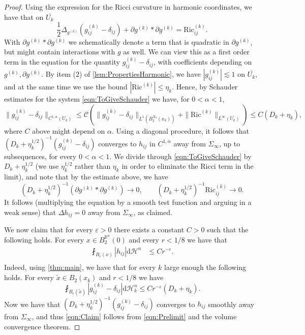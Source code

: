 \documentclass[12pt,a4paper,reqno]{amsart}
\renewcommand{\leq}{\leqslant}
\renewcommand{\d}{\ensuremath{\mathrm d}}
\renewcommand{\tilde}{\widetilde}
\begin{document}
\begin{proof}
    Using the expression for the Ricci curvature in  harmonic coordinates, we have that on $\overline{U_k}$
    \begin{equation}\label{eqn:ToGiveSchauder}
    \frac{1}{2}\Delta_{g^{(k)}} (g^{(k)}_{ij}-\delta_{ij})+\partial g^{(k)}\ast \partial g^{(k)}=\mathrm{Ric}^{(k)}_{ij}.
    \end{equation}
    With $\partial g^{(k)}\ast \partial g^{(k)}$ we schematically denote a term that is quadratic in $\partial g^{(k)}$, but might contain interactions with $g$ as well. We can view this as a first order term in the equation for the quantity $g^{(k)}_{ij} - \delta_{ij}$, with coefficients depending on $g^{(k)}, \partial g^{(k)}$. By item (2) of \cref{lem:PropertiesHarmonic}, we have $|g_{ij}^{(k)}|\lesssim 1$ on $\overline{U_k}$, and at the same time we use the bound $|\mathrm{Ric}^{(k)}| \leq \eta_k$. Hence, by Schauder estimates for the system \eqref{eqn:ToGiveSchauder} we have, for $0<\alpha<1$,
    \[
    \| g^{(k)}_{ij}-\delta_{ij}\|_{C^{1,\alpha}(U_k)}\leq\mathcal{C}\left( \|g^{(k)}_{ij}-\delta_{ij}\|_{L^1(B_2^{X_k}(x_k))} + \|\mathrm{Ric}^{(k)}\|_{L^\infty(U_k)}\right) \leq C(D_k+\eta_k),
    \]
    where $C$ above might depend on $\alpha$. Using a diagonal procedure, it follows that $(D_k+\eta_k^{1/2})^{-1}(g_{ij}^{(k)}-\delta_{ij})$ converges to $h_{ij}$ in $C^{1,\alpha}$ away from $\Sigma_\infty$, up to subsequences, for every $0<\alpha<1$. We divide through \eqref{eqn:ToGiveSchauder} by $D_k + \eta_k^{1/2}$ (we use $\eta_k^{1/2}$ rather than $\eta_k$ in order to eliminate the Ricci term in the limit), and note that by the estimate above, we have 
    \[ (D_k + \eta_k^{1/2})^{-1}(\partial g^{(k)}\ast \partial g^{(k)}) \to 0, \qquad (D_k + \eta_k^{1/2})^{-1} \mathrm{Ric}^{(k)}_{ij} \to 0. \]
    It follows (multiplying the equation by a smooth test function and arguing in a weak sense) that $\Delta h_{ij} = 0$ away from $\Sigma_\infty$, as claimed. 
    
 
    \smallskip
    We now claim that for every $\varepsilon>0$ there exists a constant $C>0$ such that the following holds. For every $x\in B_2^{\mathbb R^n}(0)$ and every $r<1/8$ we have that 
    \begin{equation}\label{eqn:Claim}
    \begin{aligned}
    \fint_{B_r(x)}|h_{ij}|\d\mathcal{H}^n&\leq Cr^{-\varepsilon}. \\
    \end{aligned}
    \end{equation}
    Indeed, using \cref{thm:main}, we have that for every $k$ large enough the following holds. For every $\tilde x\in B_2(x_k)$ and $r<1/8$ we have
    \begin{equation}\label{eqn:Prelimit}
    \fint_{B_r(\tilde x)}|g_{ij}^{(k)}-\delta_{ij}|\d\mathcal{H}^n_k\leq Cr^{-\varepsilon}(D_k+\eta_k).
    \end{equation}
    Now we have that $(D_k+\eta_k^{1/2})^{-1}(g_{ij}^{(k)}-\delta_{ij})$ converges to $h_{ij}$ smoothly away from $\Sigma_\infty$, and thus \eqref{eqn:Claim} follows from \eqref{eqn:Prelimit} and the volume convergence theorem.
    \smallskip
    

\end{proof}
\end{document}
